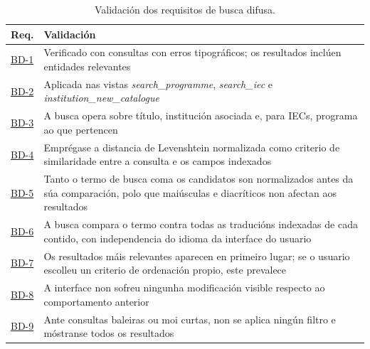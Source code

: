 \documentclass[%
    a4paper,               %
    twoside,               %
    10pt,                  %
]{article}                 %
\begin{document}
\begin{table}[h]
    \centering
    \begin{tabular}{p{1.5cm} p{\dimexpr\linewidth-1.5cm-4\tabcolsep\relax}}
        \hline
        \textbf{Req.}            & \textbf{Validación}                                                                                                                               \\
        \hline
        \hyperref[req:bd1]{BD-1} & Verificado con consultas con erros tipográficos; os resultados inclúen entidades relevantes                                                       \\
        \hyperref[req:bd2]{BD-2} & Aplicada nas vistas \textit{search\_programme}, \textit{search\_iec} e \textit{institution\_new\_catalogue}                                       \\
        \hyperref[req:bd3]{BD-3} & A busca opera sobre título, institución asociada e, para IECs, programa ao que pertencen                                                          \\
        \hyperref[req:bd4]{BD-4} & Emprégase a distancia de Levenshtein normalizada como criterio de similaridade entre a consulta e os campos indexados                             \\
        \hyperref[req:bd5]{BD-5} & Tanto o termo de busca coma os candidatos son normalizados antes da súa comparación, polo que maiúsculas e diacríticos non afectan aos resultados \\
        \hyperref[req:bd6]{BD-6} & A busca compara o termo contra todas as traducións indexadas de cada contido, con independencia do idioma da interface do usuario                 \\
        \hyperref[req:bd7]{BD-7} & Os resultados máis relevantes aparecen en primeiro lugar; se o usuario escolleu un criterio de ordenación propio, este prevalece                  \\
        \hyperref[req:bd8]{BD-8} & A interface non sofreu ningunha modificación visible respecto ao comportamento anterior                                                           \\
        \hyperref[req:bd9]{BD-9} & Ante consultas baleiras ou moi curtas, non se aplica ningún filtro e móstranse todos os resultados                                                \\
        \hline
    \end{tabular}
    \caption{Validación dos requisitos de busca difusa.}
    \label{tab:validacion_busca}
\end{table}
\end{document}

